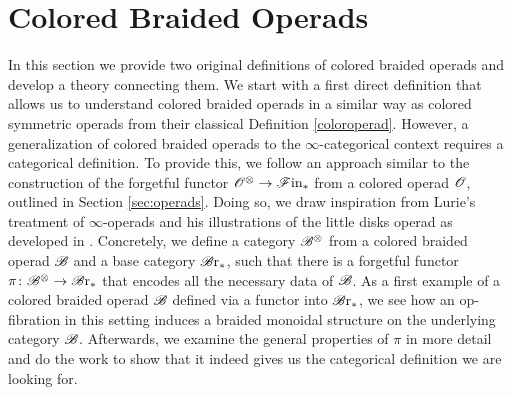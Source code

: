 \section{Colored Braided Operads}\label{sec:colbraidop}

In this section we provide two original definitions of colored
braided operads and develop a theory connecting them. We start with a first
direct definition that allows us to understand colored braided operads in a
similar way as colored symmetric operads from their classical Definition
\ref{coloroperad}. However, a generalization of colored braided operads to the
$\infty$-categorical context requires a categorical definition. To provide this,
we follow an approach similar to the construction of the forgetful functor $\mathscr{O}^{\otimes}
\to \mathscr{F} \text{in}_{\ast}$ from a colored operad $\mathscr{O}$, outlined in Section \ref{sec:operads}.
Doing so, we draw inspiration from Lurie's treatment of $\infty$-operads and his
illustrations of the little disks operad as developed in \cite[Section 2]{ha}.
Concretely, we define a category $\mathscr{B}^{\otimes}$ from a colored braided operad $\mathscr{B}$ and a
base category $\mathscr{B} \text{r}_{\ast}$, such that there is a forgetful functor $\pi \colon \mathscr{B}^{\otimes} \to
\mathscr{B} \text{r}_{\ast}$ that encodes all the necessary data of $\mathscr{B}$. As a first example of a
colored braided operad $\mathscr{B}$ defined via a functor into $\mathscr{B} \text{r}_{\ast}$, we see how an
op-fibration in this setting induces a braided monoidal structure on the
underlying category $\mathscr{B}$. Afterwards, we examine the general properties of $\pi$
in more detail and do the work to show that it indeed gives us the categorical
definition we are looking for.




